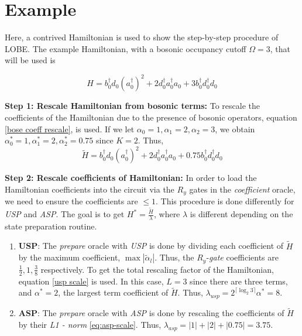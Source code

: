 \section{Example}
\label{subsec:example}
Here, a contrived Hamiltonian is used to show the step-by-step procedure of LOBE. The example Hamiltonian, with a bosonic occupancy cutoff $\Omega = 3$, that will be used is 

\begin{equation}
    \label{eq:example-ham}
    H = b_0^\dagger d_0(a_0^\dagger)^2 + 2 d_0^\dagger a_0^\dagger a_0+3 b_0^\dagger d_0^\dagger d_0
\end{equation}

\textbf{Step 1: Rescale Hamiltonian from bosonic terms:}
To rescale the coefficients of the Hamiltonian due to the presence of bosonic operators, equation \ref{bose coeff rescale}, is used. If we let $\alpha_0 = 1, \alpha_1 = 2, \alpha_2 = 3$, we obtain  $\alpha_0^* = 1,\alpha_1^* = 2, \alpha_2^* = 0.75$ since $K = 2$. Thus,
\begin{equation}
    \tilde{H} = b_0^\dagger d_0(a_0^\dagger)^2 + 2 d_0^\dagger a_0^\dagger a_0+0.75 b_0^\dagger d_0^\dagger d_0
\end{equation}

\textbf{Step 2: Rescale coefficients of Hamiltonian:} In order to load the Hamiltonian coefficients into the circuit via the $R_y$ gates in the \textit{coefficient} oracle, we need to ensure the coefficients are $\leq 1$. This procedure is done differently for \textit{USP} and \textit{ASP}. The goal is to get $H^* = \frac{\tilde{H}}{\lambda}$, where $\lambda$ is different depending on the state preparation routine.
\begin{enumerate}
    \item \textbf{USP}: The \textit{prepare} oracle with \textit{USP} is done by dividing each coefficient of $\tilde{H}$ by the maximum coefficient, $\max{|\tilde{\alpha}_l|}$. Thus, the $R_y$-\textit{gate} coefficients are $\frac{1}{2}, 1, \frac{3}{8}$ respectively. To get the total rescaling factor of the Hamiltonian, equation \ref{usp scale} is used. In this case, $L = 3$ since there are three terms, and $\alpha^* = 2$, the largest term coefficient of $\tilde{H}$. Thus, $\lambda_{usp} = 2^{\lceil \log_2{3} \rceil}\alpha^* = 8$. 
    \item \textbf{ASP}: The \textit{prepare} oracle with \textit{ASP} is done by rescaling the coefficients of $\tilde{H}$ by their \textit{L1 - norm} \ref{eq:asp-scale}. Thus, $\lambda_{asp} = |1| + |2| + |0.75| = 3.75$.
\end{enumerate}

